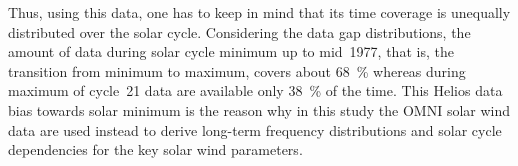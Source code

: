 Thus, using this data, one has to keep in mind that its time coverage is unequally distributed over the solar cycle. Considering the data gap distributions, the amount of data during solar cycle minimum up to mid~1977, that is, the transition from minimum to maximum, covers about \SI{68}{\percent} whereas during maximum of cycle~21 data are available only \SI{38}{\percent} of the time. This Helios data bias towards solar minimum is the reason why in this study the OMNI solar wind data are used instead to derive long-term frequency distributions and solar cycle dependencies for the key solar wind parameters.
% 

